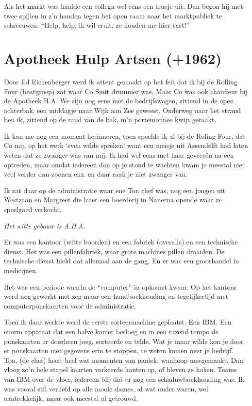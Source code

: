 \documentclass[12pt,twoside]{memoir}
\begin{document}
Als het markt was haalde een collega wel eens een trucje uit.  Dan begon hij met twee spijlen in z'n handen tegen het open raam naar het marktpubliek te schreeuwen: ``Help, help, ik wil eruit, ze houden me hier vast!''

\chapter{Apotheek Hulp Artsen (+1962)} %
\label{cha:apotheek}

Door Ed Eichenberger werd ik attent gemaakt op het feit dat ik bij de Rolling Four (beatgroep) zat waar Co Smit drummer was. Maar Co was ook chauffeur bij de Apotheek H.A. We zijn nog eens met de bedrijfswagen, zittend in de open achterbak, een middagje naar Wijk aan Zee geweest. Onderweg naar het strand ben ik, zittend op de rand van de bak, m’n portemonnee kwijt geraakt.

Ik kan me nog een moment herinneren, toen speelde ik al bij de Roling Four, dat Co mij, op het werk `even wilde spreken' want een meisje uit Assendelft had laten weten dat ze zwanger was van mij. Ik had wel eens met haar gevreeën na een optreden, maar omdat iedereen dan op je stond te wachten kwam je meestal niet veel verder dan zoenen enz. en daar raak je niet zwanger van. 

Ik zat daar op de administratie waar ene Ton chef was, nog een jongen uit Westzaan en Margreet die later een boerderij in Nauerna opende waar ze speelgoed verkocht. 

\emph{Het witte gebouw is A.H.A.}

Er was een kantoor (witte boorden) en een fabriek (overalls) en een technische dienst. Het was een pillenfabriek, waar grote machines pillen draaiden. De technische dienst hield dat allemaal aan de gang. En er was een groothandel in medicijnen. 

Het was een periode waarin de “computer” in opkomst kwam. Op het kantoor werd nog gewerkt met zeg maar een handboekhouding en tegelijkertijd met computerponskaarten voor de administratie. 

Toen ik daar werkte werd de eerste sorteermachine geplaatst. Een IBM. Een enorm apparaat dat een halve kamer besloeg en in een razend tempo de ponskaarten er doorheen joeg, sorteerde en telde. Wat je maar wilde kon je door er ponskaarten met gegevens erin te stoppen, te weten komen over je bedrijf. Ton, (de chef) heeft heel wat momenten van paniek, wanhoop meegemaakt. Dan vloog zo’n hele stapel kaarten verkeerde kanten op, of bleven ze haken. Teams van IBM over de vloer, iedereen blij dat er nog een schaduwboekhouding was. Ik was vooral stil verliefd op alle mooie dames, al wat ouder waren, wel aantrekkelijk, maar ook meestal al getrouwd. 
\end{document}
